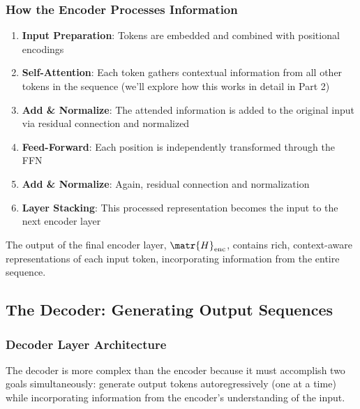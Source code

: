 \subsubsection{How the Encoder Processes Information}

\begin{enumerate}
  \item \textbf{Input Preparation}: Tokens are embedded and combined with positional encodings
  \item \textbf{Self-Attention}: Each token gathers contextual information from all other tokens in the sequence (we'll explore how this works in detail in Part 2)
  \item \textbf{Add \& Normalize}: The attended information is added to the original input via residual connection and normalized
  \item \textbf{Feed-Forward}: Each position is independently transformed through the FFN
  \item \textbf{Add \& Normalize}: Again, residual connection and normalization
  \item \textbf{Layer Stacking}: This processed representation becomes the input to the next encoder layer
\end{enumerate}

The output of the final encoder layer, $\matr{H}_{\text{enc}}$, contains rich, context-aware representations of each input token, incorporating information from the entire sequence.

\subsection{The Decoder: Generating Output Sequences}

\subsubsection{Decoder Layer Architecture}

The decoder is more complex than the encoder because it must accomplish two goals simultaneously: generate output tokens autoregressively (one at a time) while incorporating information from the encoder's understanding of the input.

